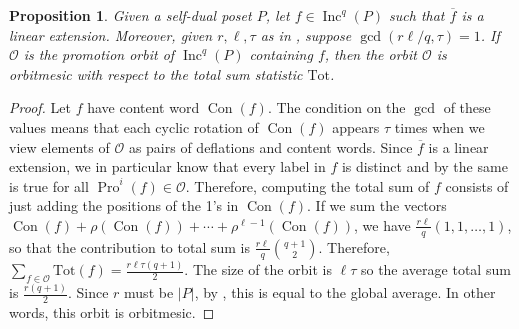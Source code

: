 \documentclass[11pt]{amsart}
\newtheorem{proposition}[theorem]{Proposition}
\theoremstyle{definition}
\newcommand{\tot}{\mathrm{Tot}}
\DeclareMathOperator{\Inc}{\mathrm{Inc}}
\DeclareMathOperator{\Pro}{\mathrm{Pro}}
\DeclareMathOperator{\Con}{\mathrm{Con}}
\begin{document}
\begin{proposition}\label{linear_ext} Given a self-dual poset $P$, let $f \in \Inc^q(P)$ such that $\overline{f}$ is a linear extension. Moreover, given $r,\ell,\tau$ as in , suppose $\gcd(r\ell/q,\tau) = 1$. If $\mathcal{O}$ is the promotion orbit of $\Inc^q(P)$ containing $f$, then the orbit $\mathcal{O}$ is orbitmesic with respect to the total sum statistic $\tot$.
\end{proposition}


\begin{proof} Let $f$ have content word $\Con(f)$. The condition on the $\gcd$ of these values means that each cyclic rotation of $\Con(f)$ appears $\tau$ times when we view elements of $\mathcal{O}$ as pairs of deflations and content words. Since $\overline{f}$ is a linear extension, we in particular know that every label in $f$ is distinct and by  the same is true for all $\Pro^i(f) \in \mathcal{O}$. Therefore, computing the total sum of $f$ consists of just adding the positions of the 1's in $\Con(f)$. If we sum the vectors $\Con(f) + \rho(\Con(f)) + \cdots + \rho^{\ell-1}(\Con(f))$, we have $\frac{r \ell}{q}(1,1,\ldots,1)$, so that the contribution to total sum is $\frac{r \ell}{q}{q+1 \choose 2}$. Therefore, $\sum_{f \in \mathcal{O}} \tot(f) = \frac{r \ell \tau (q+1)}{2}$.
The size of the orbit is $\ell\tau$ so the average total sum is $\frac{r(q+1)}{2}$. Since $r$ must be $\vert P \vert$, by , this is equal to the global average. In other words, this orbit is orbitmesic.
\end{proof}
\end{document}
